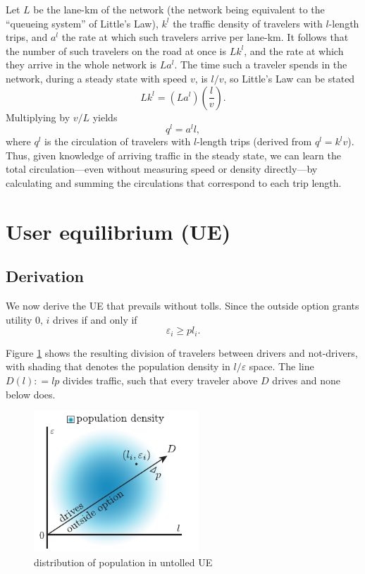 \documentclass[preprint,authoryear]{elsarticle}
\newcommand{\ve}{\varepsilon}
\begin{document}
Let $L$ be the lane-km of the network (the network being equivalent to the ``queueing system'' of Little's Law), $k^l$ the traffic density of travelers with $l$-length trips, and $a^l$ the rate at which such travelers arrive per lane-km. It follows that the number of such travelers on the road at once is $Lk^l$, and the rate at which they arrive in the whole network is $La^l$. The time such a traveler spends in the network, during a steady state with speed $v$, is $l/v$, so Little's Law can be stated
\begin{equation}\label{eq:little}
	Lk^l = (La^l) \left( \frac{l}{v}\right).
\end{equation}
Multiplying by $v/L$ yields
\begin{equation}
	q^l = a^l l,
\end{equation}
where $q^l$ is the circulation of travelers with $l$-length trips (derived from $q^l=k^lv$). Thus, given knowledge of arriving traffic in the steady state, we can learn the total circulation---even without measuring speed or density directly---by calculating and summing the circulations that correspond to each trip length.

\section{User equilibrium (UE)}
\label{sec:user_equilibrium}

\subsection{Derivation}
\label{ssec:derivation}

We now derive the UE that prevails without tolls. Since the outside option grants utility $0$, $i$ drives if and only if
\begin{equation} \label{eq:v-epsilon}
 \ve_i \geq pl_i.
\end{equation}

Figure \ref{fig:density} shows the resulting division of travelers between drivers and not-drivers, with shading that denotes the population density in $l/\ve$ space. The line $D(l): = lp$ divides traffic, such that every traveler above $D$ drives and none below does.
\begin{figure}[h]
	\centering
	\includegraphics[width=0.55\textwidth]{img/mode-split3}
	\caption{distribution of population in untolled UE}
	\label{fig:density}
\end{figure}
\end{document}

